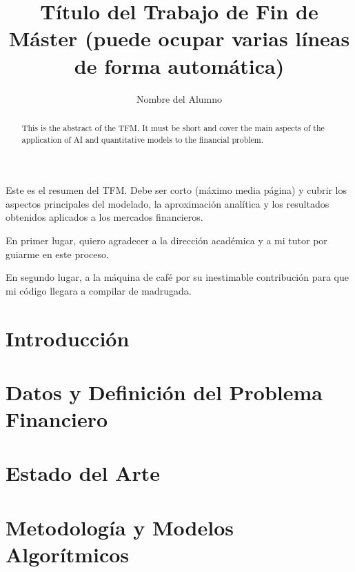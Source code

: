 \documentclass[twoside,spanish,a4paper,12pt]{tfm}
\title{Título del Trabajo de Fin de Máster (puede ocupar varias líneas de forma automática)}
\author{Nombre del Alumno}
\begin{document}
\portada
\cleardoublepage


\begin{resumen}
  Este es el resumen del TFM. Debe ser corto (máximo media página) y cubrir los aspectos principales del modelado, la aproximación analítica y los resultados obtenidos aplicados a los mercados financieros.
\end{resumen}
\cleardoublepage

\begin{abstract}
  This is the abstract of the TFM. It must be short and cover the main aspects of the application of AI and quantitative models to the financial problem.
\end{abstract}
\cleardoublepage

\begin{agradecimientos}
  En primer lugar, quiero agradecer a la dirección académica y a mi tutor por guiarme en este proceso.

  En segundo lugar, a la máquina de café por su inestimable contribución para que mi código llegara a compilar de madrugada.
\end{agradecimientos}
\cleardoublepage

\tableofcontents

\pagestyle{tfm}
\justify


\chapter{Introducción}


\chapter{Datos y Definición del Problema Financiero}


\chapter{Estado del Arte}


\chapter{Metodología y Modelos Algorítmicos}

\end{document}
